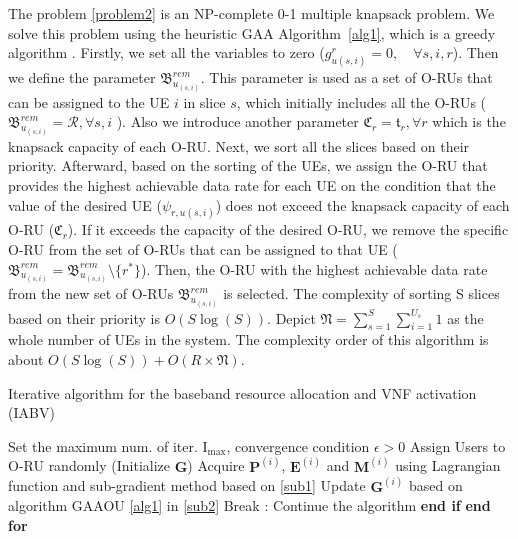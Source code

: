 \documentclass[lettersize,journal]{IEEEtran}
\begin{document}
The problem \eqref{problem2} is an NP-complete 0-1 multiple knapsack problem.
We solve this problem using the heuristic GAA Algorithm~\ref{alg1}, which is a greedy algorithm \cite{akccay2007greedy,lee2018dynamic}.
Firstly, we set all the variables to zero ($g^r_{u(s,i)} = 0, \quad \forall s, i, r$).
Then we define the parameter ${\mathfrak{B}}^{rem}_{u_{(s,i)}}$. This parameter is used as a set of O-RUs that can be assigned to the UE $i$ in slice $s$, which initially includes all the O-RUs (${\mathfrak{B}}^{rem}_{u_{(s,i)}} = \mathcal{R}, \forall s, i$ ).
Also we introduce another parameter $ \mathfrak{C}_r = \mathfrak{t}_r, \forall r$
which is the knapsack capacity of each O-RU.
Next, we sort all the slices based on their priority.
Afterward, based on the sorting of the UEs,
we assign the O-RU that provides the highest achievable data rate for each UE on the condition that the value of the desired UE ($\psi_{r,u(s,i)}$) does not exceed the knapsack capacity of each O-RU ($ \mathfrak{C}_r$).
If it exceeds the capacity of the desired O-RU, we remove the specific O-RU from the set of O-RUs that can be assigned to that UE (${\mathfrak{B}}^{rem}_{u_{(s,i)}} = {\mathfrak{B}}^{rem}_{u_{(s,i)}} \setminus \{{r^*}\} $). Then, the O-RU with the highest achievable data rate from the new set of O-RUs ${\mathfrak{B}}^{rem}_{u_{(s,i)}}$ is selected.
The complexity of sorting S slices based on their priority is $O(S\log(S))$.
Depict $\mathfrak{N} =  \sum_{s=1}^S\sum_{i=1}^{U_s} 1$ as the whole number of UEs in the system.
The complexity order of this algorithm is about $O(S\log(S)) + O(R\times \mathfrak{N})$.


 \begin{algorithm}[t!]
 \small
\caption{Iterative algorithm for the baseband resource allocation and VNF activation (IABV)}\label{alg2}
\begin{algorithmic}[1]
\State  Set the maximum num. of iter. ${\text{I}}_{\max}$, convergence condition $\epsilon > 0$ \label{a21}
\State  Assign Users to O-RU randomly (Initialize $\boldsymbol{G}$) \label{a22}
\label{23}
\State Acquire $\boldsymbol{P}^{(i)}$, $\boldsymbol{E}^{(i)}$ and $\boldsymbol{M}^{(i)}$ using Lagrangian function and sub-gradient method based on \eqref{sub1}
\State Update $\boldsymbol{G}^{(i)}$   based on algorithm GAAOU \eqref{alg1} in  \eqref{sub2}
\State Break
\Else:   Continue the algorithm
\EndIf
\State \textbf{end if}
\EndFor
\State \textbf{end for} \label{24}
\end{algorithmic}
\end{algorithm}
\vspace{-3mm}
\end{document}
